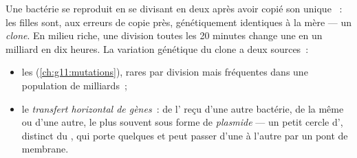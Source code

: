 \begin{proposition}\label{prop:g11:antibiotic-resistance:variation}
Une bactérie se reproduit en se divisant en deux après avoir copié son
unique ~: les filles sont, aux erreurs de copie près,
génétiquement identiques à la mère --- un \emph{clone}. En milieu
riche, une division toutes les 20 minutes change une  en un
milliard en dix heures. La variation génétique du clone a deux
sources~:
\begin{itemize}
  \item les \emph{} (\cref{ch:g11:mutations}), rares par
        division mais fréquentes dans une population de milliards~;
  \item le \emph{transfert horizontal de gènes}~:
        de l' reçu d'une autre bactérie, de la même  ou d'une
        autre, le plus souvent sous forme de \emph{plasmide} --- un
        petit cercle d', distinct du , qui porte quelques
         et peut passer d'une  à l'autre par un pont de
        membrane.
\end{itemize}
\end{proposition}
\admitted

